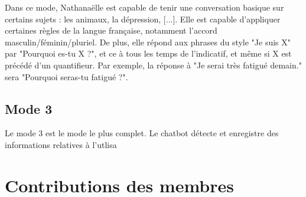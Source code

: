 \documentclass[paper=a4, fontsize=11pt]{article}
\begin{document}
Dans ce mode, Nathanaëlle est capable de tenir une conversation basique sur certains sujets : les animaux, la dépression, [...]. Elle est capable d'appliquer certaines règles de la langue française, notamment l'accord masculin/féminin/pluriel. De plus, elle répond aux phrases du style "Je suis X" par "Pourquoi es-tu X ?", et ce à tous les temps de l'indicatif, et même si X est précédé d'un quantifieur. Par exemple, la réponse à "Je serai très fatigué demain." sera "Pourquoi seras-tu fatigué ?".

\subsection{Mode 3}

Le mode 3 est le mode le plus complet. Le chatbot détecte et enregistre des informations relatives à l'utlisa

\section{Contributions des membres}
\end{document}

